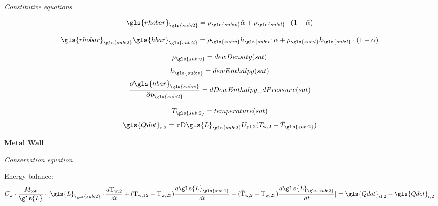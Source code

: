 \documentclass[11pt]{article} %
\begin{document}
\begin{center}
\textit{Constitutive equations}
\end{center}
\begin{equation}
\gls{rhobar}_{\gls{sub:2}} = \rho_{\gls{sub:v}} \bar{\alpha} + \rho_{\gls{sub:l}} \cdot (1 - \bar{\alpha})
\end{equation}

\begin{equation}
\gls{rhobar}_{\gls{sub:2}} \gls{hbar}_{\gls{sub:2}}= \rho_{\gls{sub:v}} h_{\gls{sub:v}} \bar{\alpha} + \rho_{\gls{sub:l}} h_{\gls{sub:l}} \cdot (1 - \bar{\alpha})
\end{equation}

\begin{equation}
\rho_{\gls{sub:v}} = dewDensity(sat)
\end{equation}
\begin{equation}
h_{\gls{sub:v}} = dewEnthalpy(sat)
\end{equation}
\begin{equation}
\frac{\partial \gls{hbar}_{\gls{sub:v}}}{\partial p_{\gls{sub:2}}}= dDewEnthalpy\_dPressure(sat)
\end{equation}

\begin{equation}
\bar{T}_{\gls{sub:2}} = temperature(sat)
\end{equation}
\begin{equation}
\gls{Qdot}_\text{r,2} = \pi \text{D} \gls{L}_{\gls{sub:2}} U_\text{pf,2} (T_\text{w,2} - \bar{T}_{\gls{sub:2}})
\end{equation}


\begin{flushleft}
{\bf Metal Wall}\\
\end{flushleft}
\begin{center}
\textit{Conservation equation}
\end{center}
Energy balance:\\
\begin{equation}
C_\text{w} \cdot \frac{M_\text{tot}}{\gls{L}} \cdot [\gls{L}_{\gls{sub:2}} \cdot  \frac{d \text{T}_\text{w,2}}{d t} +  (\text{T}_\text{w,12} - \text{T}_\text{w,23})  \frac{d \gls{L}_{\gls{sub:1}}}{d t} +  (\bar{\text{T}}_\text{w,2} - \text{T}_\text{w,23})  \frac{d \gls{L}_{\gls{sub:2}}}{d t}] = \gls{Qdot}_\text{sf,2} - \gls{Qdot}_\text{r,2}
\end{equation}
\end{document}
